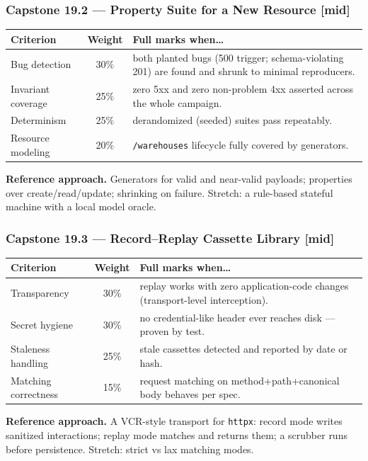 \subsubsection*{Capstone 19.2 --- Property Suite for a New Resource [mid]}
\begin{center}\small
\begin{tabularx}{\textwidth}{l c X}
\toprule
\textbf{Criterion} & \textbf{Weight} & \textbf{Full marks when\ldots} \\
\midrule
Bug detection & 30\% & both planted bugs (500 trigger; schema-violating 201) are found and shrunk to minimal reproducers. \\
Invariant coverage & 25\% & zero 5xx and zero non-problem 4xx asserted across the whole campaign. \\
Determinism & 25\% & derandomized (seeded) suites pass repeatably. \\
Resource modeling & 20\% & \texttt{/warehouses} lifecycle fully covered by generators. \\
\bottomrule
\end{tabularx}
\end{center}
\textbf{Reference approach.} Generators for valid and near-valid payloads;
properties over create/read/update; shrinking on failure. Stretch: a
rule-based stateful machine with a local model oracle.

\subsubsection*{Capstone 19.3 --- Record--Replay Cassette Library [mid]}
\begin{center}\small
\begin{tabularx}{\textwidth}{l c X}
\toprule
\textbf{Criterion} & \textbf{Weight} & \textbf{Full marks when\ldots} \\
\midrule
Transparency & 30\% & replay works with zero application-code changes (transport-level interception). \\
Secret hygiene & 30\% & no credential-like header ever reaches disk --- proven by test. \\
Staleness handling & 25\% & stale cassettes detected and reported by date or hash. \\
Matching correctness & 15\% & request matching on method+path+canonical body behaves per spec. \\
\bottomrule
\end{tabularx}
\end{center}
\textbf{Reference approach.} A VCR-style transport for \texttt{httpx}:
record mode writes sanitized interactions; replay mode matches and returns
them; a scrubber runs before persistence. Stretch: strict vs lax matching
modes.

